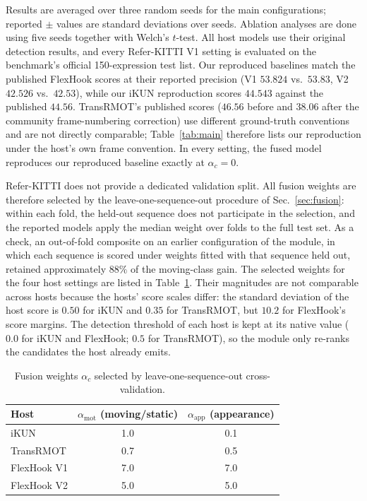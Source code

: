 \documentclass{article}
\begin{document}
Results are averaged over three random seeds for the main configurations; reported $\pm$ values are standard deviations over seeds. Ablation analyses are done using five seeds together with Welch's $t$-test. All host models use their original detection results, and every Refer-KITTI V1 setting is evaluated on the benchmark's official 150-expression test list. Our reproduced baselines match the published FlexHook scores at their reported precision (V1 $53.824$ vs.\ $53.83$, V2 $42.526$ vs.\ $42.53$), while our iKUN reproduction scores $44.543$ against the published $44.56$. TransRMOT's published scores ($46.56$ before and $38.06$ after the community frame-numbering correction) use different ground-truth conventions and are not directly comparable; Table~\ref{tab:main} therefore lists our reproduction under the host's own frame convention. In every setting, the fused model reproduces our reproduced baseline exactly at $\alpha_c{=}0$.

Refer-KITTI does not provide a dedicated validation split. All fusion weights are therefore selected by the leave-one-sequence-out procedure of Sec.~\ref{sec:fusion}: within each fold, the held-out sequence does not participate in the selection, and the reported models apply the median weight over folds to the full test set. As a check, an out-of-fold composite on an earlier configuration of the module, in which each sequence is scored under weights fitted with that sequence held out, retained approximately $88\%$ of the moving-class gain. The selected weights for the four host settings are listed in Table~\ref{tab:alphas}. Their magnitudes are not comparable across hosts because the hosts' score scales differ: the standard deviation of the host score is $0.50$ for iKUN and $0.35$ for TransRMOT, but $10.2$ for FlexHook's score margins. The detection threshold of each host is kept at its native value ($0.0$ for iKUN and FlexHook; $0.5$ for TransRMOT), so the module only re-ranks the candidates the host already emits.

\begin{table}[b]
  \centering
  \caption{Fusion weights $\alpha_c$ selected by leave-one-sequence-out cross-validation.}
  \label{tab:alphas}
  \footnotesize
  \begin{tabular*}{\linewidth}{@{\extracolsep{\fill}}lcc}
    \hline
    Host        & $\alpha_{\mathrm{mot}}$ (moving/static) & $\alpha_{\mathrm{app}}$ (appearance) \\
    \hline
    iKUN        & 1.0 & 0.1 \\
    TransRMOT   & 0.7 & 0.5 \\
    FlexHook V1 & 7.0 & 7.0 \\
    FlexHook V2 & 5.0 & 5.0 \\
    \hline
  \end{tabular*}
\end{table}
\end{document}
